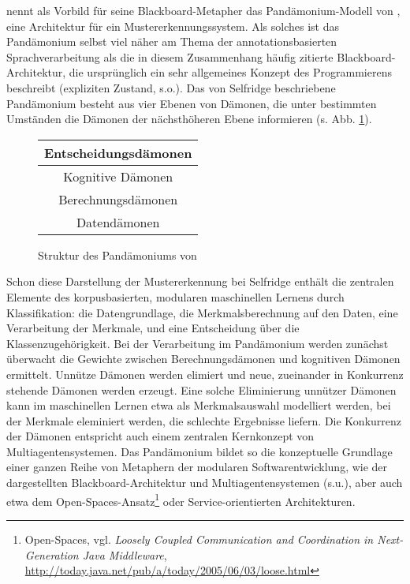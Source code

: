 \documentclass[abstracton, 12pt]{scrartcl}
\begin{document}
\citet{Newell1962} nennt als Vorbild für seine Blackboard-Metapher das Pan\-dämon\-ium-Modell von \citet{Selfridge1959}, eine Architektur für ein Mustererkennungssystem. Als solches ist das Pan\-dämon\-ium selbst viel näher am Thema der annotationsbasierten Sprachverarbeitung als die in diesem Zusammenhang häufig zitierte Blackboard-Architektur, die ursprünglich ein sehr allgemeines Konzept des Programmierens beschreibt (expliziten Zustand, s.o.). Das von Selfridge beschriebene Pandämonium besteht aus vier Ebenen von Dämonen, die unter bestimmten Umständen die Dämonen der nächsthöheren Ebene informieren (s. Abb. \ref{tab-pan}).

\begin{figure}
\begin{center}
\begin{tabular}{c}
Entscheidungsdämonen \\ \hline
Kognitive Dämonen \\ \hline
Berechnungsdämonen\\ \hline
Datendämonen\\
\end{tabular}
\end{center}
\caption[Struktur des Pandämoniums]{Struktur des Pandämoniums von \citet{Selfridge1959}} \label{tab-pan}
\end{figure}

Schon diese Darstellung der Mustererkennung bei Selfridge enthält die zentralen Elemente des korpusbasierten, modularen maschinellen Lernens durch Klassifikation: die Datengrundlage, die Merkmalsberechnung auf den Daten, eine Verarbeitung der Merkmale, und eine Entscheidung über die Klassenzugehörigkeit. Bei der Verarbeitung im Pandämonium werden zunächst überwacht die Gewichte zwischen Berechnungsdämonen und kognitiven Dämonen ermittelt. Unnütze Dämonen werden elimiert und neue, zueinander in Konkurrenz stehende Dämonen werden erzeugt. Eine solche Eliminierung unnützer Dämonen kann im maschinellen Lernen etwa als Merkmalsauswahl modelliert werden, bei der Merkmale eleminiert werden, die schlechte Ergebnisse liefern. Die Konkurrenz der Dämonen entspricht auch einem zentralen Kernkonzept von Multiagentensystemen. Das Pandämonium bildet so die konzeptuelle Grundlage einer ganzen Reihe von Metaphern der modularen Softwarentwicklung, wie der dargestellten Blackboard-Architektur und Multiagentensystemen (s.u.), aber auch etwa dem Open-Spaces-Ansatz\footnote{Open-Spaces, vgl. \emph{Loosely Coupled Communication and Coordination in Next-Generation Java Middleware}, \url{http://today.java.net/pub/a/today/2005/06/03/loose.html}} oder Service-orientierten Architekturen.
\end{document}
